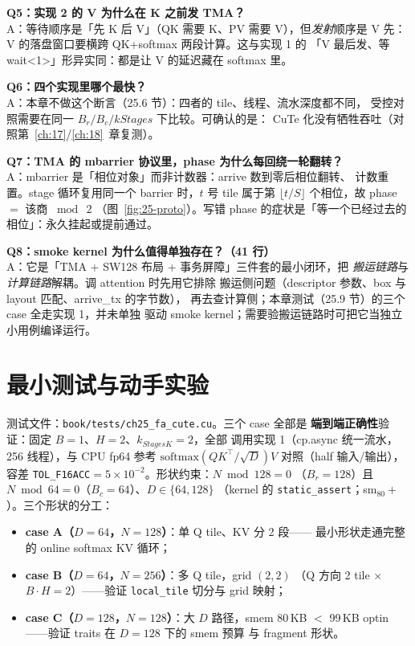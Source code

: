 \textbf{Q5：实现 2 的 V 为什么在 K 之前发 TMA？}\\
A：等待顺序是「先 K 后 V」（QK 需要 K、PV 需要 V），但\emph{发射}顺序是
V 先：V 的落盘窗口要横跨 QK+softmax 两段计算。这与实现 1 的
「V 最后发、等 wait<1>」形异实同：都是让 V 的延迟藏在 softmax 里。

\textbf{Q6：四个实现里哪个最快？}\\
A：本章不做这个断言（25.6 节）：四者的 tile、线程、流水深度都不同，
受控对照需要在同一 $B_r/B_c/kStages$ 下比较。可确认的是：
CuTe 化没有牺牲吞吐（对照第~\ref{ch:17}/\ref{ch:18}~章复测）。

\textbf{Q7：TMA 的 mbarrier 协议里，phase 为什么每回绕一轮翻转？}\\
A：mbarrier 是「相位对象」而非计数器：arrive 数到零后相位翻转、
计数重置。stage 循环复用同一个 barrier 时，$t$ 号 tile 属于第
$\lfloor t/S\rfloor$ 个相位，故 phase $=$ 该商 $\bmod\ 2$
（图~\ref{fig:25-proto}）。写错 phase 的症状是「等一个已经过去的
相位」：永久挂起或提前通过。

\textbf{Q8：smoke kernel 为什么值得单独存在？（41 行）}\\
A：它是「TMA + SW128 布局 + 事务屏障」三件套的最小闭环，把
\emph{搬运链路}与\emph{计算链路}解耦。调 attention 时先用它排除
搬运侧问题（descriptor 参数、box 与 layout 匹配、arrive\_tx 的字节数），
再去查计算侧；本章测试（25.9 节）的三个 case 全走实现 1，并未单独
驱动 smoke kernel；需要验搬运链路时可把它当独立小用例编译运行。

\section{最小测试与动手实验}

测试文件：\texttt{book/\allowbreak{}tests/\allowbreak{}ch25\_\allowbreak{}fa\_\allowbreak{}cute.\allowbreak{}cu}。三个 case 全部是
\textbf{端到端正确性}验证：固定 $B{=}1$、$H{=}2$、$k_{StagesK}{=}2$，全部
调用实现 1（cp.async 统一流水，256 线程），与 CPU fp64 参考
$\mathrm{softmax}(QK^\top/\sqrt{D})V$ 对照（half 输入/输出），容差
\texttt{TOL\_F16ACC}$=5\times10^{-2}$。形状约束：$N\bmod 128=0$
（$B_r{=}128$）且 $N\bmod 64=0$（$B_c{=}64$）、$D\in\{64,128\}$
（kernel 的 \texttt{static\_assert}；sm$_{80}+$）。三个形状的分工：

\begin{itemize}
  \item \textbf{case A（$D{=}64$，$N{=}128$）}：单 Q tile、KV 分 2 段——
        最小形状走通完整的 online softmax KV 循环；
  \item \textbf{case B（$D{=}64$，$N{=}256$）}：多 Q tile，grid $(2,2)$
        （Q 方向 2 tile $\times$ $B{\cdot}H{=}2$）——验证
        \texttt{local\_tile} 切分与 grid 映射；
  \item \textbf{case C（$D{=}128$，$N{=}128$）}：大 $D$ 路径，smem
        80\,KB $<$ 99\,KB optin——验证 traits 在 $D{=}128$ 下的 smem 预算
        与 fragment 形状。
\end{itemize}


